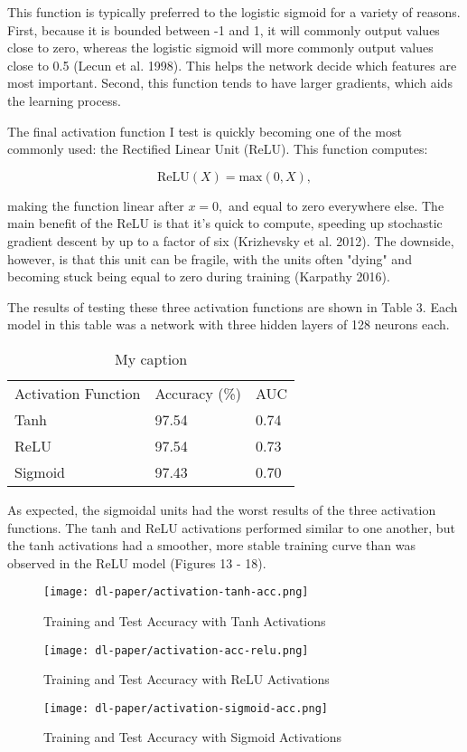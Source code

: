 \documentclass[12pt]{article}  %
\theoremstyle{definition}
\theoremstyle{remark}
\begin{document}
\par This function is typically preferred to the  logistic sigmoid for a variety of reasons. First, because it is bounded between -1 and 1,  it will commonly output values close to zero, whereas the logistic sigmoid will more commonly output values close to 0.5 (Lecun et al. 1998). This helps the network decide which features are most important. Second,  this function tends to have larger gradients, which aids the learning process. 
\par The final activation function I test is quickly becoming one of the most commonly used: the Rectified Linear Unit (ReLU). This function computes:

$$ \text{ReLU}(X) = \text{max}(0,X), $$

making the function linear after $x=0,$ and equal to zero everywhere else. The main benefit of the ReLU is that it's quick to compute, speeding up stochastic gradient descent by up to a factor of six (Krizhevsky et al. 2012). The downside, however, is that this unit can be fragile, with the units often "dying" and becoming stuck being equal to zero during training (Karpathy 2016).

\par The results of testing these three activation functions are shown in Table 3. Each model in this table was a network with three hidden layers of 128 neurons each. 

\begin{table}[!h]
\centering
\caption{My caption}
\label{my-label}
\begin{tabular}{lll}
Activation Function & Accuracy (\%) & AUC  \\
Tanh                & 97.54         & 0.74 \\
ReLU                & 97.54         & 0.73 \\
Sigmoid             & 97.43         & 0.70
\end{tabular}
\end{table}

\par As expected, the sigmoidal units had the worst results of the three activation functions. The tanh and ReLU activations performed similar to one another, but the tanh activations had a smoother, more stable training curve than was observed in the ReLU model (Figures 13 - 18). 

\begin{figure}[!h]
  \texttt{[image: dl-paper/activation-tanh-acc.png]}
  \caption{Training and Test Accuracy with Tanh Activations}\label{tanh-acc}
\endminipage\hfill
{}
  \texttt{[image: dl-paper/activation-acc-relu.png]}
  \caption{Training and Test Accuracy with ReLU Activations}\label{relu-acc}
\endminipage\hfill
{}%
  \texttt{[image: dl-paper/activation-sigmoid-acc.png]}
  \caption{Training and Test Accuracy with Sigmoid Activations}\label{sigmoid-acc}
\endminipage
\end{figure}
\end{document}
